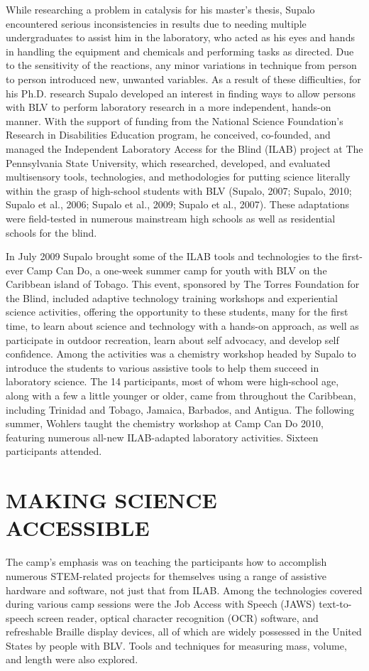 \documentclass[11.5pt]{sig-alternate} %
\begin{document}
\begin{large}
While researching a problem in catalysis for his master’s thesis, Supalo encountered serious inconsistencies in results due to needing multiple undergraduates to assist him in the laboratory, who acted as his eyes and hands in handling the equipment and chemicals and performing tasks as directed. Due to the sensitivity of the reactions, any minor variations in technique from person to person introduced new, unwanted variables. As a result of these difficulties, for his Ph.D. research Supalo developed an interest in finding ways to allow persons with BLV to perform laboratory research in a more independent, hands-on manner. With the support of funding from the National Science Foundation’s Research in Disabilities Education program, he conceived, co-founded, and managed the Independent Laboratory Access for the Blind (ILAB) project at The Pennsylvania State University, which researched, developed, and evaluated multisensory tools, technologies, and methodologies for putting science literally within the grasp of high-school students with BLV (Supalo, 2007; Supalo, 2010; Supalo et al., 2006; Supalo et al., 2009; Supalo et al., 2007). These adaptations were field-tested in numerous mainstream high schools as well as residential schools for the blind.

In July 2009 Supalo brought some of the ILAB tools and technologies to the first-ever Camp Can Do, a one-week summer camp for youth with BLV on the Caribbean island of Tobago. This event, sponsored by The Torres Foundation for the Blind, included adaptive technology training workshops and experiential science activities, offering the opportunity to these students, many for the first time, to learn about science and technology with a hands-on approach, as well as participate in outdoor recreation, learn about self advocacy, and develop self confidence. Among the activities was a chemistry workshop headed by Supalo to introduce the students to various assistive tools to help them succeed in laboratory science. The 14 participants, most of whom were high-school age, along with a few a little younger or older, came from throughout the Caribbean, including Trinidad and Tobago, Jamaica, Barbados, and Antigua. The following summer, Wohlers taught the chemistry workshop at Camp Can Do 2010, featuring numerous all-new ILAB-adapted laboratory activities. Sixteen participants attended.

\section*{MAKING SCIENCE ACCESSIBLE}
The camp’s emphasis was on teaching the participants how to accomplish numerous STEM-related projects for themselves using a range of assistive hardware and software, not just that from ILAB. Among the technologies covered during various camp sessions were the Job Access with Speech (JAWS) text-to-speech screen reader, optical character recognition (OCR) software, and refreshable Braille display devices, all of which are widely possessed in the United States by people with BLV. Tools and techniques for measuring mass, volume, and length were also explored.


\end{large}
\end{document}
